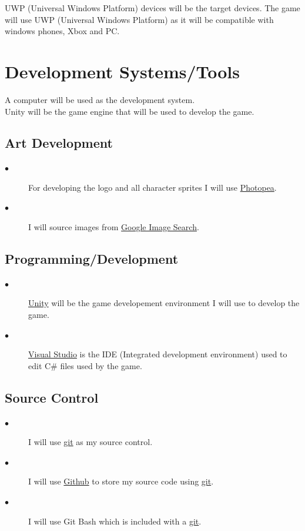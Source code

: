 \documentclass[a4paper]{scrreprt}
\begin{document}
UWP (Universal Windows Platform) devices will be the target devices. The game will use UWP (Universal Windows Platform) as it will be compatible with windows phones, Xbox and PC.

\section{Development Systems/Tools}

A computer will be used as the development system.\\
Unity will be the game engine that will be used to develop the game.\\

\subsection{Art Development}

\begin{description}
    \item[$\bullet$] For developing the logo and all character sprites I will use \href{https://www.photopea.com/}{Photopea}.
    \item[$\bullet$] I will source images from \href{https://images.google.com/}{Google Image Search}.
\end{description}

\subsection{Programming/Development}

\begin{description}
    \item[$\bullet$] \href{https://unity3d.com/}{Unity} will be the game developement environment I will use to develop the game.
    \item[$\bullet$] \href{https://visualstudio.microsoft.com/}{Visual Studio} is the IDE (Integrated development environment) used to edit C\# files used by the game.
\end{description}

\subsection{Source Control}

\begin{description}
    \item[$\bullet$] I will use \href{https://git-scm.com/}{git} as my source control.
    \item[$\bullet$] I will use \href{https://github.com}{Github} to store my source code using \href{https://git-scm.com/}{git}.
    \item[$\bullet$] I will use Git Bash which is included with a \href{https://git-scm.com/downloads}{git}.
\end{description}
\end{document}
